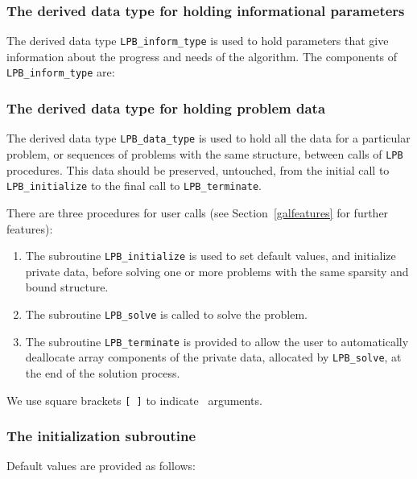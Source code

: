 \documentclass{galahad}
\newcommand{\packagename}{LPB}
\begin{document}

\subsubsection{The derived data type for holding informational
 parameters}\label{typeinform}
The derived data type
{\tt \packagename\_inform\_type}
is used to hold parameters that give information about the progress and needs
of the algorithm. The components of
{\tt \packagename\_inform\_type}
are:




\subsubsection{The derived data type for holding problem data}\label{typedata}
The derived data type
{\tt \packagename\_data\_type}
is used to hold all the data for a particular problem,
or sequences of problems with the same structure, between calls of
{\tt \packagename} procedures.
This data should be preserved, untouched, from the initial call to
{\tt \packagename\_initialize}
to the final call to
{\tt \packagename\_terminate}.


\galarguments
There are three procedures for user calls
(see Section~\ref{galfeatures} for further features):

\begin{enumerate}
\item The subroutine
      {\tt \packagename\_initialize}
      is used to set default values, and initialize private data,
      before solving one or more problems with the
      same sparsity and bound structure.
\item The subroutine
      {\tt \packagename\_solve}
      is called to solve the problem.
\item The subroutine
      {\tt \packagename\_terminate}
      is provided to allow the user to automatically deallocate array
       components of the private data, allocated by
       {\tt \packagename\_solve},
       at the end of the solution process.
\end{enumerate}
We use square brackets {\tt [ ]} to indicate \optional\ arguments.


\subsubsection{The initialization subroutine}\label{subinit}
 Default values are provided as follows:
\vspace*{1mm}
\end{document}
